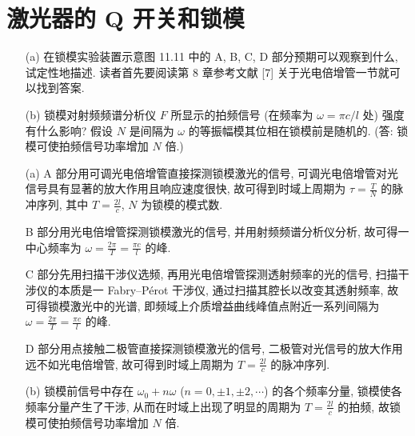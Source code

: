 \documentclass{note}
\begin{document}
\fi
\setcounter{chapter}{10}
\chapter{激光器的 Q 开关和锁模}
\begin{exe}
    \begin{itemize}
        \item[(a)] 在锁模实验装置示意图 11.11 中的 A, B, C, D 部分预期可以观察到什么, 试定性地描述. 读者首先要阅读第 8 章参考文献 [7] 关于光电倍增管一节就可以找到答案.
        \item[(b)] 锁模对射频频谱分析仪 $F$ 所显示的拍频信号 (在频率为 $\omega=\pi c/l$ 处) 强度有什么影响? 假设 $N$ 是间隔为 $\omega$ 的等振幅模其位相在锁模前是随机的. (答: 锁模可使拍频信号功率增加 $N$ 倍.)
    \end{itemize}
\end{exe}
\begin{sol}
    \begin{itemize}
        \item[(a)] A 部分用可调光电倍增管直接探测锁模激光的信号, 可调光电倍增管对光信号具有显著的放大作用且响应速度很快, 故可得到时域上周期为 $\tau=\frac{T}{N}$ 的脉冲序列, 其中 $T=\frac{2l}{c}$, $N$ 为锁模的模式数.

        B 部分用光电倍增管探测锁模激光的信号, 并用射频频谱分析仪分析, 故可得一中心频率为 $\omega=\frac{2\pi}{T}=\frac{\pi c}{l}$ 的峰.

        C 部分先用扫描干涉仪选频, 再用光电倍增管探测透射频率的光的信号, 扫描干涉仪的本质是一 Fabry–Pérot 干涉仪, 通过扫描其腔长以改变其透射频率, 故可得锁模激光中的光谱, 即频域上介质增益曲线峰值点附近一系列间隔为 $\omega=\frac{2\pi}{T}=\frac{\pi c}{l}$ 的峰.

        D 部分用点接触二极管直接探测锁模激光的信号, 二极管对光信号的放大作用远不如光电倍增管, 故可得到时域上周期为 $T=\frac{2l}{c}$ 的脉冲序列.
        \item[(b)] 锁模前信号中存在 $\omega_0+n\omega$ ($n=0,\pm 1,\pm 2,\cdots$) 的各个频率分量, 锁模使各频率分量产生了干涉, 从而在时域上出现了明显的周期为 $T=\frac{2l}{c}$ 的拍频, 故锁模可使拍频信号功率增加 $N$ 倍.
    \end{itemize}
\end{sol}
\end{document}
